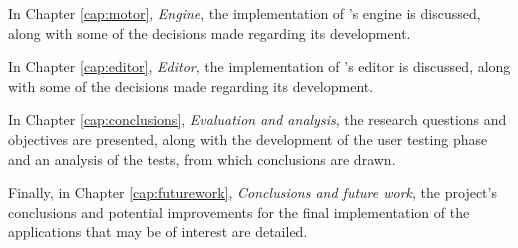\medskip

In Chapter \ref{cap:motor}, \textit{Engine}, the implementation of \baker's engine is discussed, along with some of the decisions made regarding its development.
\medskip

In Chapter \ref{cap:editor}, \textit{Editor}, the implementation of \baker's editor is discussed, along with some of the decisions made regarding its development.

\medskip

In Chapter \ref{cap:conclusions}, \textit{Evaluation and analysis}, the research questions and objectives are presented, along with the development of the user testing phase and an analysis of the tests, from which conclusions are drawn.

\medskip

Finally, in Chapter \ref{cap:futurework}, \textit{Conclusions and future work}, the project's conclusions and potential improvements for the final implementation of the applications that may be of interest are detailed.








